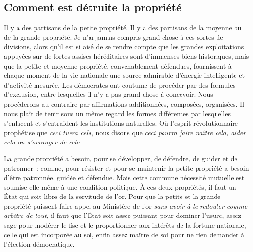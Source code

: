 \documentclass[french,twoside]{book} %
\begin{document}
\subsection[{Comment est détruite la propriété}]{Comment est détruite la propriété}
\noindent Il y a des partisans de la petite propriété. Il y a des partisans de la moyenne ou de la grande propriété. Je n’ai jamais compris grand-chose à ces sortes de divisions, alors qu’il est si aisé de se rendre compte que les grandes exploitations appuyées sur de fortes assises héréditaires sont d’immenses biens historiques, mais que la petite et moyenne propriété, convenablement défendues, fournissent à chaque moment de la vie nationale une source admirable d’énergie intelligente et d’activité mesurée. Les démocrates ont coutume de procéder par des formules d’exclusion, entre lesquelles il n’y a pas grand-chose à concevoir. Nous procéderons au contraire par affirmations additionnées, composées, organisées. Il nous plaît de tenir sous un même regard les formes différentes par lesquelles s’enlacent et s’entraident les institutions naturelles. Où l’esprit révolutionnaire prophétise que \emph{ceci tuera cela}, nous disons que \emph{ceci pourra faire naître cela, aider cela ou s’arranger de cela}.\par
La grande propriété a besoin, pour se développer, de défendre, de guider et de patronner : comme, pour résister et pour se maintenir la petite propriété a besoin d’être patronnée, guidée et défendue. Mais cette commune nécessité mutuelle est soumise elle-même à une condition politique. À ces deux propriétés, il faut un État qui soit libre de la servitude de l’or. Pour que la petite et la grande propriété puissent faire appel au Ministère de l’or \emph{sans avoir à le redouter comme arbitre de tout}, il faut que l’État soit assez puissant pour dominer l’usure, assez sage pour modérer le fisc et le proportionner aux intérêts de la fortune nationale, celle qui est incorporée au sol, enfin assez maître de soi pour ne rien demander à l’élection démocratique.
\end{document}
